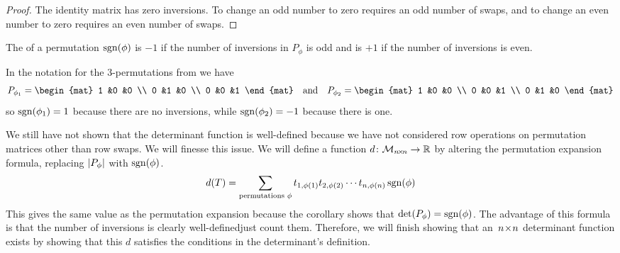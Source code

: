 \begin{proof}
The identity matrix has zero inversions.
To change an odd number to zero requires an odd number of swaps,
and to change an even number to zero requires an even number of swaps.
\end{proof}

\begin{definition}
The %
of a permutation \( \operatorname{sgn}(\phi) \)
is \( -1 \) if the number of inversions in \( P_\phi \) is odd and is
\( +1 \) if the number of inversions is even.
\end{definition}

\begin{example}
In the notation for the $3$-permutations
from  we have
\begin{equation*}
  P_{\phi_1}=
  \begin{mat}
    1  &0  &0  \\
    0  &1  &0  \\
    0  &0  &1
  \end{mat}
  \quad\text{and}\quad
  P_{\phi_2}=
  \begin{mat}
    1  &0  &0  \\
    0  &0  &1  \\
    0  &1  &0  
  \end{mat}
\end{equation*}
so
\( \operatorname{sgn}(\phi_1)=1 \) because there are no inversions, 
while \( \operatorname{sgn}(\phi_2)=-1 \) because there is one.
\end{example}

We still have not shown that the determinant function is
well-defined because we have not considered row operations 
on permutation matrices other than row swaps.
We will finesse this issue.
We will define a function
\( \mbox{$d\colon \mathcal{M}_{n \! \times \! n}\to \mathbb{R}$} \)
by altering the permutation expansion formula, replacing
$\deter{P_\phi}$ with $\operatorname{sgn}(\phi)$.
\begin{equation*}
  d(T)=
  \sum_{\text{permutations\ }\phi}t_{1,\phi(1)}t_{2,\phi(2)}\cdots t_{n,\phi(n)}
                                 \operatorname{sgn}(\phi)
\end{equation*}
This gives the same value as the permutation expansion
because the corollary shows that $\det(P_\phi)=\operatorname{sgn}(\phi)$.
The advantage of this formula is that the number of inversions 
is clearly well-defined\Dash  just count them.
Therefore, we will finish showing that an~$n \! \times \! n$ determinant function 
exists by showing  that this $d$
satisfies the conditions in the determinant's definition.

